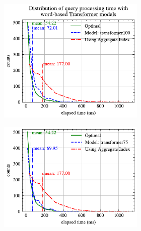 \begin{figure}[p]
	\centering
	\begin{subfigure}{0.45\textwidth}
		\begin{subfigure}{\textwidth}
			\centering
			\includegraphics[]{my/graphics/perf_dist_transformer100_B.pdf}
		\end{subfigure}
		\vfill
		\begin{subfigure}{\textwidth}
			\centering
			\includegraphics[]{my/graphics/perf_dist_transformer75_B.pdf}
		\end{subfigure}
		\vfill
		\begin{subfigure}{\textwidth}
			\centering

\end{subfigure}
\end{subfigure}
\end{figure}
